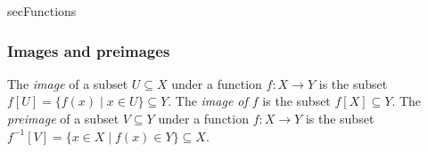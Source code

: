 \begin{tldr}{secFunctions}
\subsubsection*{Images and preimages}

\begin{tldrlist}
 The \textit{image} of a subset $U \subseteq X$ under a function $f : X \to Y$ is the subset $f[U] = \{ f(x) \mid x \in U \} \subseteq Y$. The \textit{image of $f$} is the subset $f[X] \subseteq Y$.
 The \textit{preimage} of a subset $V \subseteq Y$ under a function $f : X \to Y$ is the subset $f^{-1}[V] = \{ x \in X \mid f(x) \in Y \} \subseteq X$.
\end{tldrlist}

\end{tldr}

